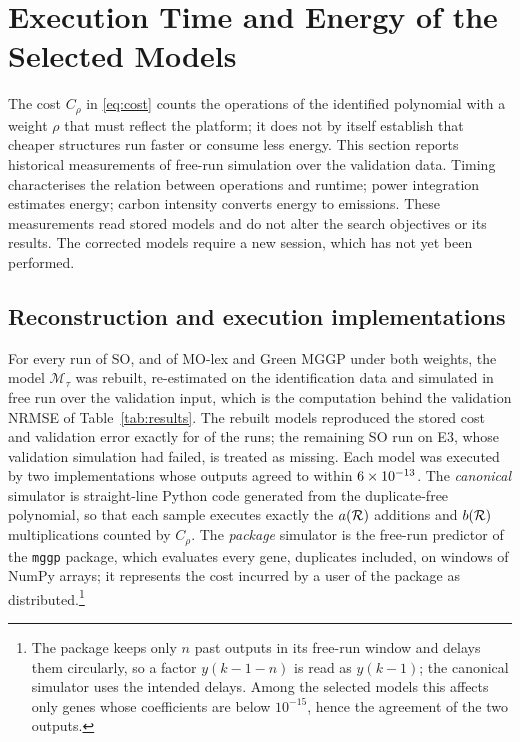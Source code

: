 \section{Execution Time and Energy of the Selected Models}\label{sec:energy}

The cost $C_\rho$ in \eqref{eq:cost} counts the operations of the identified polynomial with a weight $\rho$ that must
reflect the platform; it does not by itself establish that cheaper structures run faster or consume less energy. This section reports historical measurements of free-run simulation over the validation data. Timing characterises the relation between operations and runtime; power integration estimates energy; carbon intensity converts energy to emissions. These measurements read stored models and do not alter the search objectives or its results. The corrected models require a new session, which has not yet been performed.

\subsection{Reconstruction and execution implementations}

For every run of SO, and of MO-lex and Green MGGP under both weights, the model $\mathcal M_\tau$ was rebuilt,
re-estimated on the identification data and simulated in free run over the validation input, which is the computation
behind the validation NRMSE of Table~\ref{tab:results}. The rebuilt models reproduced the stored cost and validation
error exactly for \enNModels{} of the \enNRecords{} runs; the remaining SO run on E3, whose validation simulation had
failed, is treated as missing. Each model was executed by two implementations whose outputs agreed to within
$6\times10^{-13}$. The \emph{canonical} simulator is straight-line Python code generated from the duplicate-free
polynomial, so that each sample executes exactly the $a(\mathcal{R})$ additions and $b(\mathcal{R})$ multiplications counted by
$C_\rho$. The \emph{package} simulator is the free-run predictor of the \texttt{mggp} package, which
evaluates every gene, duplicates included, on windows of NumPy arrays; it represents the cost incurred by a user of the
package as distributed.\footnote{The package keeps only $n$ past outputs in its free-run window and delays them
circularly, so a factor $y(k-1-n)$ is read as $y(k-1)$; the canonical simulator uses the intended delays. Among the
selected models this affects only genes whose coefficients are below $10^{-15}$, hence the agreement of the two
outputs.}

